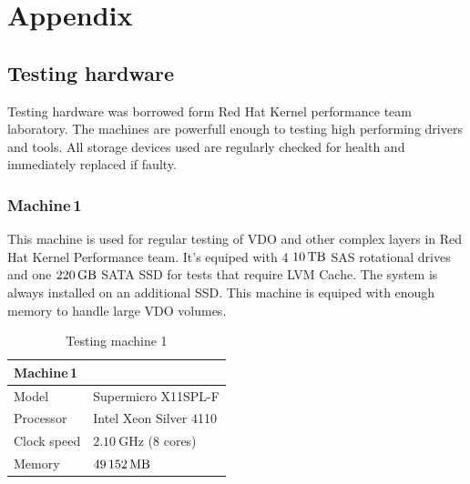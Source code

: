 \documentclass[
  color, %
  table, %
  lof,   %
  lot,   %
]{fithesis3}
\begin{document}




\chapter{Appendix}
\section{Testing hardware}
\label{hardware}
Testing hardware was borrowed form Red Hat Kernel performance team laboratory. The machines are powerfull enough to testing high performing drivers and tools. All storage devices used are regularly checked for health and immediately replaced if faulty.


\subsection{Machine\,1}
\label{hw:1}
This machine is used for regular testing of VDO and other complex layers in Red Hat Kernel Performance team. It's equiped with 4 $\SI{10}{\tera\byte}$ SAS rotational drives and one $\SI{220}{\giga\byte}$ SATA SSD for tests that require LVM Cache. The system is always installed on an additional SSD. This machine is equiped with enough memory to handle large VDO volumes.


\begin{table}
\centering
\begin{tabular}{|l|l|}
\hline
   \multicolumn{2}{|l|}{Machine\,1} \\ \hline %
    Model & Supermicro X11SPL-F\\
    \hline
    Processor & Intel Xeon Silver 4110  \\
    \hline
    Clock speed & $\SI{2.10}{\giga\hertz}$ (8 cores) \\
    \hline
    Memory & $\SI{49152}{\mega\byte}$ \\
    \hline
\end{tabular}
\caption{Testing machine 1}
\end{table}
\end{document}
